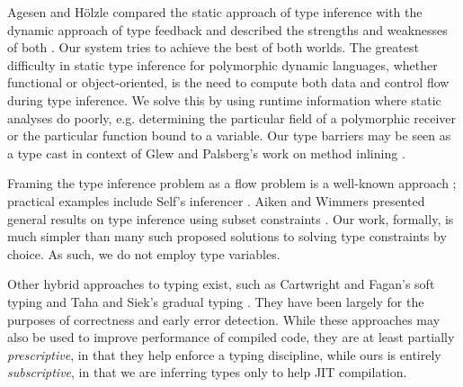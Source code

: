 Agesen and H\"olzle compared the static approach of type inference with the
dynamic approach of type feedback and described the strengths and weaknesses
of both \cite{Agesen95}. Our system tries to achieve the best of both
worlds. The greatest difficulty in static type inference for polymorphic
dynamic languages, whether functional or object-oriented, is the need to
compute both data and control flow during type inference. We solve this by
using runtime information where static analyses do poorly,
e.g. determining the particular field of a polymorphic receiver or the
particular function bound to a variable. Our type barriers may be seen as a
type cast in context of Glew and
Palsberg's work on method inlining \cite{Glew02}.

Framing the type inference problem as a flow problem is a well-known approach
\cite{Oxhoj92, Palsberg91}; practical examples include Self's inferencer
\cite{Agesen93TI}.
Aiken and Wimmers presented general results on
type inference using subset constraints \cite{Aiken93}.
Our work, formally, is much simpler than many such
proposed solutions to solving type constraints by choice. As such, we do not employ type
variables.

Other hybrid approaches to typing exist, such as Cartwright and Fagan's soft
typing and Taha and Siek's gradual typing \cite{Cartwright91, Siek07}. They
have been largely for the purposes of correctness and early error
detection.
While these approaches may also be used to improve performance of
compiled code, they are at least partially \emph{prescriptive}, in that they
help enforce a typing discipline, while ours is entirely \emph{subscriptive}, in that
we are inferring types only to help JIT compilation.



